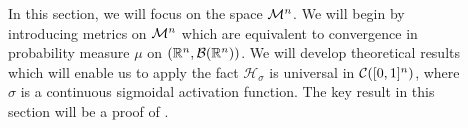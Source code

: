 \begin{description}
\item[] In this section, we will focus on the space ${\mathcal M}^n$. We will begin by introducing metrics on ${\mathcal M}^n$ which are equivalent to convergence in probability measure $\mu$ on $({\mathbb R}^n, {\mathcal B}({\mathbb R}^n))$. We will develop theoretical results which will enable us to apply the fact  $\mathcal{H}_{\sigma}$ is universal in ${\mathcal C}([0,1]^n)$, where $\sigma$ is a continuous sigmoidal activation function. The key result in this section will be a proof of .
\end{description}